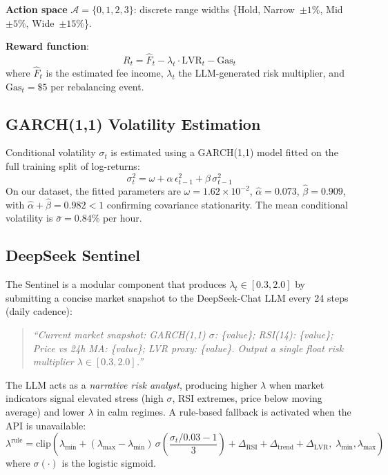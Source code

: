 \documentclass{article}
\begin{document}
\textbf{Action space} $\mathcal{A} = \{0, 1, 2, 3\}$: discrete range widths
\{Hold, Narrow~$\pm1\%$, Mid~$\pm5\%$, Wide~$\pm15\%$\}.

\textbf{Reward function}:
\begin{equation}
  R_t = \hat{F}_t - \lambda_t \cdot \text{LVR}_t - \text{Gas}_t
  \label{eq:reward}
\end{equation}
where $\hat{F}_t$ is the estimated fee income, $\lambda_t$ the LLM-generated
risk multiplier, and $\text{Gas}_t = \$5$ per rebalancing event.

\subsection{GARCH(1,1) Volatility Estimation}

Conditional volatility $\sigma_t$ is estimated using a GARCH(1,1) model
\citep{bollerslev1986garch} fitted on the full training split of log-returns:
\begin{equation}
  \sigma_t^2 = \omega + \alpha\,\epsilon_{t-1}^2 + \beta\,\sigma_{t-1}^2
\end{equation}
On our dataset, the fitted parameters are $\omega = 1.62 \times 10^{-2}$,
$\hat{\alpha} = 0.073$, $\hat{\beta} = 0.909$, with $\hat{\alpha} + \hat{\beta}
= 0.982 < 1$ confirming covariance stationarity.  The mean conditional
volatility is $\bar{\sigma} = 0.84\%$ per hour.

\subsection{DeepSeek Sentinel}

The Sentinel is a modular component that produces $\lambda_t \in [0.3, 2.0]$
by submitting a concise market snapshot to the DeepSeek-Chat LLM every
24 steps (daily cadence):

\begin{quote}
\small\textit{``Current market snapshot: GARCH(1,1) $\sigma$: \{value\};
RSI(14): \{value\}; Price vs 24h MA: \{value\}; LVR proxy: \{value\}.
Output a single float risk multiplier $\lambda \in [0.3, 2.0]$.''}
\end{quote}

The LLM acts as a \emph{narrative risk analyst}, producing higher $\lambda$
when market indicators signal elevated stress (high $\sigma$, RSI extremes,
price below moving average) and lower $\lambda$ in calm regimes.  A
rule-based fallback is activated when the API is unavailable:
\begin{equation}
  \lambda^{\text{rule}} = \text{clip}\!\left(
    \lambda_{\min} + (\lambda_{\max} - \lambda_{\min})\,
    \sigma\!\left(\frac{\sigma_t/0.03 - 1}{3}\right)
    + \Delta_{\text{RSI}} + \Delta_{\text{trend}} + \Delta_{\text{LVR}},\;
    \lambda_{\min},\lambda_{\max}
  \right)
\end{equation}
where $\sigma(\cdot)$ is the logistic sigmoid.
\end{document}
